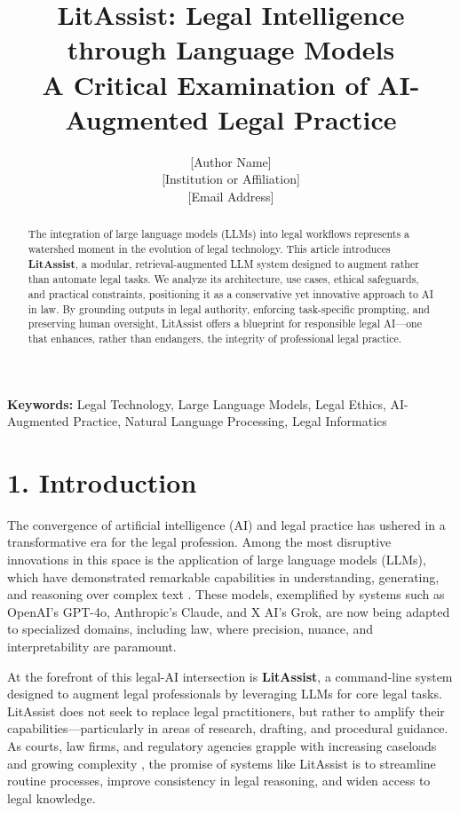 \documentclass[12pt,a4paper]{article}
\title{\textbf{LitAssist: Legal Intelligence through Language Models} \\ \large A Critical Examination of AI-Augmented Legal Practice}
\author{[Author Name]\\
\small [Institution or Affiliation] \\
\small [Email Address]}
\date{}
\begin{document}
\maketitle

\begin{abstract}
\noindent
The integration of large language models (LLMs) into legal workflows represents a watershed moment in the evolution of legal technology. This article introduces \textbf{LitAssist}, a modular, retrieval-augmented LLM system designed to augment rather than automate legal tasks. We analyze its architecture, use cases, ethical safeguards, and practical constraints, positioning it as a conservative yet innovative approach to AI in law. By grounding outputs in legal authority, enforcing task-specific prompting, and preserving human oversight, LitAssist offers a blueprint for responsible legal AI—one that enhances, rather than endangers, the integrity of professional legal practice.
\end{abstract}

\vspace{1em}
\noindent \textbf{Keywords:} Legal Technology, Large Language Models, Legal Ethics, AI-Augmented Practice, Natural Language Processing, Legal Informatics

\section*{1. Introduction}

The convergence of artificial intelligence (AI) and legal practice has ushered in a transformative era for the legal profession. Among the most disruptive innovations in this space is the application of large language models (LLMs), which have demonstrated remarkable capabilities in understanding, generating, and reasoning over complex text \cite{Bommarito2022}. These models, exemplified by systems such as OpenAI's GPT-4o, Anthropic's Claude, and X AI's Grok, are now being adapted to specialized domains, including law, where precision, nuance, and interpretability are paramount.

At the forefront of this legal-AI intersection is \textbf{LitAssist}, a command-line system designed to augment legal professionals by leveraging LLMs for core legal tasks. LitAssist does not seek to replace legal practitioners, but rather to amplify their capabilities—particularly in areas of research, drafting, and procedural guidance. As courts, law firms, and regulatory agencies grapple with increasing caseloads and growing complexity \cite{Casey2020}, the promise of systems like LitAssist is to streamline routine processes, improve consistency in legal reasoning, and widen access to legal knowledge.
\end{document}

